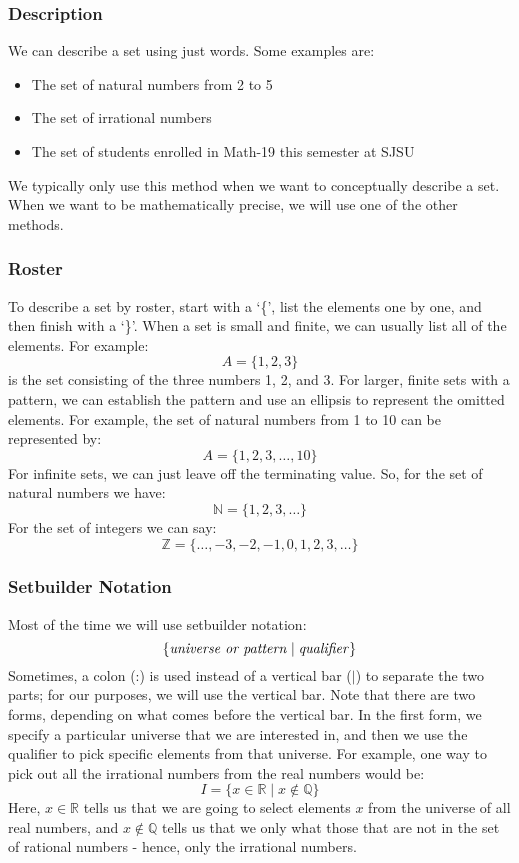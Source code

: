 \documentclass[letterpaper,12pt,fleqn]{article}
\begin{document}
\subsubsection*{Description}

We can describe a set using just words. Some examples are:
\begin{itemize}
\item The set of natural numbers from 2 to 5
\item The set of irrational numbers
\item The set of students enrolled in Math-19 this semester at SJSU
\end{itemize}
We typically only use this method when we want to conceptually describe a set.
When we want to be mathematically precise, we will use one of the other
methods.

\subsubsection*{Roster}

To describe a set by roster, start with a `\{', list the elements one by one,
and then finish with a `\}'. When a set is small and finite, we can usually
list all of the elements.  For example:
\[A=\{1, 2, 3\}\]
is the set consisting of the three numbers 1, 2, and 3. For larger, finite sets
with a pattern, we can establish the pattern and use an ellipsis to represent
the omitted elements. For example, the set of natural numbers from 1 to 10 can
be represented by:
\[A=\{1, 2, 3, \ldots, 10\}\]
For infinite sets, we can just leave off the terminating value. So, for the
set of natural numbers we have:
\[\mathbb{N}=\{1, 2, 3, \ldots\}\]
For the set of integers we can say:
\[\mathbb{Z}=\{\ldots, -3, -2, -1, 0, 1, 2, 3, \ldots\}\]

\subsubsection*{Setbuilder Notation}

Most of the time we will use setbuilder notation:
\[\{\mbox{\emph{universe or pattern}}\mid\mbox{\emph{qualifier}}\}\]
Sometimes, a colon (:) is used instead of a vertical bar ($\mid$) to separate
the two parts; for our purposes, we will use the vertical bar. Note that there
are two forms, depending on what comes before the vertical bar. In the first
form, we specify a particular universe that we are interested in, and then we
use the qualifier to pick specific elements from that universe. For example,
one way to pick out all the irrational numbers from the real numbers would be:
\[I=\{x\in\mathbb{R}\mid x\notin\mathbb{Q}\}\]
Here, $x\in\mathbb{R}$ tells us that we are going to select elements $x$ from
the universe of all real numbers, and $x\notin\mathbb{Q}$ tells us that we only
what those that are not in the set of rational numbers - hence, only the
irrational numbers.
\end{document}
